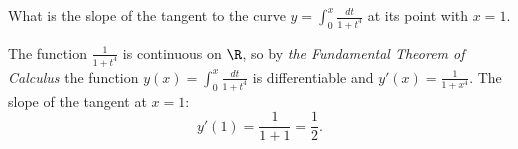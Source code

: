 
\begin{question}
What is the slope of the tangent to the curve $y=\int_0^x\frac{dt}{1+t^4}$ at its point with $x=1$.
\end{question}

\begin{solution}
The function $\frac1{1+t^4}$ is continuous on $\R$, so by \emph{the Fundamental Theorem of Calculus} the function $y(x)=\int_0^x\frac{dt}{1+t^4}$ is differentiable and $y'(x)=\frac1{1+x^4}$. The slope of the tangent at $x=1$:
\[
y'(1)=\frac1{1+1}=\frac12.
\]
\end{solution}
